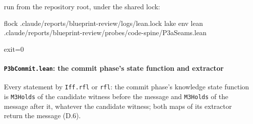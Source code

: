 run from the repository root, under the shared lock:

\begin{shellcode}
flock .claude/reports/blueprint-review/logs/lean.lock lake env lean .claude/reports/blueprint-review/probes/code-spine/P3aSeams.lean
\end{shellcode}


\begin{srccode}
exit=0
\end{srccode}

\paragraph{\texttt{P3bCommit.lean}: the commit phase's state function and extractor}\label{sec:gen-probe-spine-P3bCommit}

Every statement by \texttt{Iff.\allowbreak{}rfl} or \texttt{rfl}: the commit phase's knowledge state function is \texttt{M3Holds} of the candidate witness before the message and \texttt{M3Holds} of the message after it, whatever the candidate witness; both maps of its extractor return the message (D.6).


